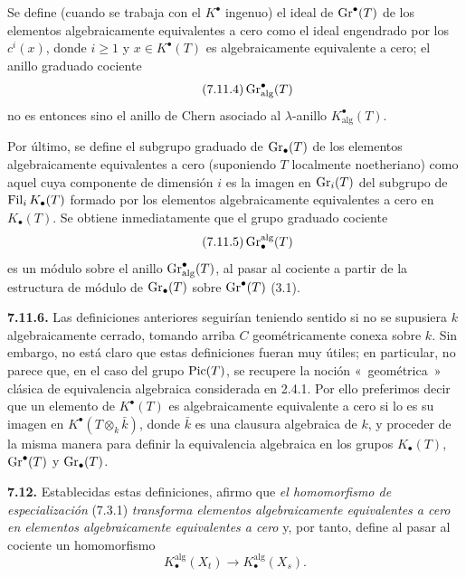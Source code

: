 Se define (cuando se trabaja con el \(K^\bullet\) ingenuo) el ideal de \(\operatorname{Gr}^\bullet(T)\) de los elementos algebraicamente equivalentes a cero como el ideal engendrado por los \(c^i(x)\), donde \(i\geq1\) y \(x\in K^\bullet(T)\) es algebraicamente equivalente a cero; el anillo graduado cociente
\begin{equation}\tag{7.11.4}
  \operatorname{Gr}^\bullet_{\mathrm{alg}}(T)
\end{equation}
no es entonces sino el anillo de Chern asociado al \(\lambda\)-anillo \(K^\bullet_{\mathrm{alg}}(T)\).

Por último, se define el subgrupo graduado de \(\operatorname{Gr}_\bullet(T)\) de los elementos algebraicamente equivalentes a cero (suponiendo \(T\) localmente noetheriano) como aquel cuya componente de dimensión \(i\) es la imagen en \(\operatorname{Gr}_i(T)\) del subgrupo de \(\operatorname{Fil}_iK_\bullet(T)\) formado por los elementos algebraicamente equivalentes a cero en \(K_\bullet(T)\). Se obtiene inmediatamente que el grupo graduado cociente
\begin{equation}\tag{7.11.5}
  \operatorname{Gr}_\bullet^{\mathrm{alg}}(T)
\end{equation}
es un módulo sobre el anillo \(\operatorname{Gr}^\bullet_{\mathrm{alg}}(T)\), al pasar al cociente a partir de la estructura de módulo de \(\operatorname{Gr}_\bullet(T)\) sobre \(\operatorname{Gr}^\bullet(T)\) (3.1).

\textbf{7.11.6.} Las definiciones anteriores seguirían teniendo sentido si no se supusiera \(k\) algebraicamente cerrado, tomando arriba \(C\) geométricamente conexa sobre \(k\). Sin embargo, no está claro que estas definiciones fueran muy útiles; en particular, no parece que, en el caso del grupo \(\operatorname{Pic}(T)\), se recupere la noción «~geométrica~» clásica de equivalencia algebraica considerada en 2.4.1. Por ello preferimos decir que un elemento de \(K^\bullet(T)\) es algebraicamente equivalente a cero si lo es su imagen en \(K^\bullet(T\otimes_k\bar k)\), donde \(\bar k\) es una clausura algebraica de \(k\), y proceder de la misma manera para definir la equivalencia algebraica en los grupos \(K_\bullet(T)\), \(\operatorname{Gr}^\bullet(T)\) y \(\operatorname{Gr}_\bullet(T)\).

\textbf{7.12.} Establecidas estas definiciones, afirmo que \emph{el homomorfismo de especialización} (7.3.1) \emph{transforma elementos algebraicamente equivalentes a cero en elementos algebraicamente equivalentes a cero} y, por tanto, define al pasar al cociente un homomorfismo
\begin{equation}\tag{7.12.1}
  K_\bullet^{\mathrm{alg}}(X_t)\longrightarrow K_\bullet^{\mathrm{alg}}(X_s).
\end{equation}

